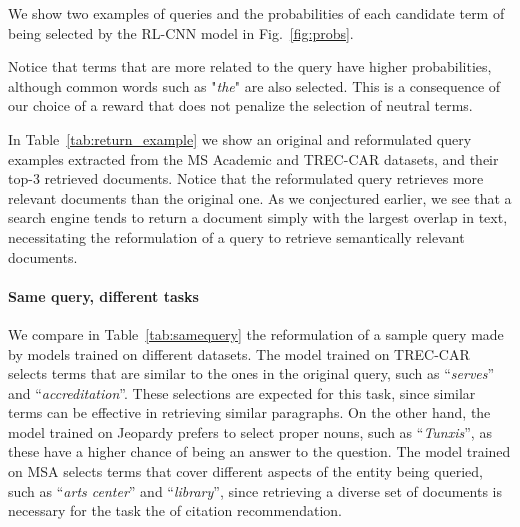 \documentclass[11pt,letterpaper]{article}
\begin{document}
We show two examples of queries and the probabilities of each candidate term of being selected by the RL-CNN model in Fig.~\ref{fig:probs}.

Notice that terms that are more related to the query have higher probabilities, although common words such as "\textit{the}" are also selected. This is a consequence of our choice of a reward that does not penalize the selection of neutral terms.


In Table~\ref{tab:return_example} we show an original and reformulated query examples extracted from the MS Academic and TREC-CAR datasets, and their top-3 retrieved documents. Notice that the reformulated query retrieves more relevant documents than the original one. As we conjectured earlier, we see that a search engine tends to return a document simply with the largest overlap in text, necessitating the reformulation of a query to retrieve semantically relevant documents.

\paragraph{Same query, different tasks} We compare in Table~\ref{tab:samequery} the reformulation of a sample query made by models trained on different datasets. The model trained on TREC-CAR selects terms that are similar to the ones in the original query, such as ``\textit{serves}'' and ``\textit{accreditation}''. These selections are expected for this task, since similar terms can be effective in retrieving similar paragraphs. On the other hand, the model trained on Jeopardy prefers to select proper nouns, such as ``\textit{Tunxis}'', as these have a higher chance of being an answer to the question. The model trained on MSA selects terms that cover different aspects of the entity being queried, such as ``\textit{arts center}'' and ``\textit{library}'', since retrieving a diverse set of documents is necessary for the task the of citation recommendation.


\end{document}
